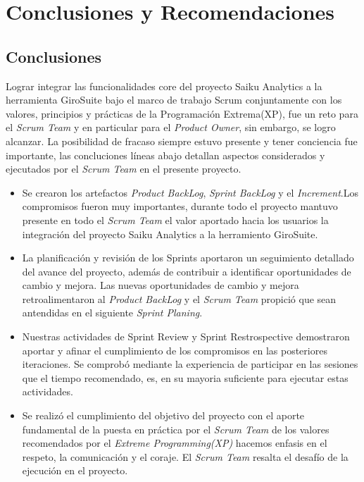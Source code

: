 \chapter{Conclusiones y Recomendaciones} \label{chapter:IV}
\begin{spacing}{1.5}
\section{Conclusiones}
Lograr integrar las funcionalidades core del proyecto Saiku Analytics a la herramienta GiroSuite bajo el marco de trabajo Scrum conjuntamente con los valores, principios y pr\'{a}cticas de la Programaci\'{o}n Extrema(XP), fue un reto para el \textit{Scrum Team} y en particular para el \textit{Product Owner}, sin embargo, se logro alcanzar. La posibilidad de fracaso siempre estuvo presente y tener conciencia fue importante, las concluciones l\'{i}neas abajo detallan aspectos considerados y ejecutados por el \textit{Scrum Team} en el presente proyecto.
\begin{itemize}
	
	\item Se crearon los artefactos \textit{Product BackLog}, \textit{Sprint BackLog} y el \textit{Increment}.Los compromisos fueron muy importantes, durante todo el proyecto mantuvo presente en todo el \textit{Scrum Team} el valor aportado hacia los usuarios la integraci\'{o}n del proyecto Saiku Analytics a la herramiento GiroSuite.
	
	\item La planificaci\'{o}n y revisi\'{o}n de los Sprints aportaron un seguimiento detallado del avance del proyecto, adem\'{a}s de contribuir a identificar oportunidades de cambio y mejora. Las nuevas oportunidades de cambio y mejora retroalimentaron al \textit{Product BackLog} y el \textit{Scrum Team} propici\'{o} que sean antendidas en el siguiente \textit{Sprint Planing}.
	
	\item Nuestras actividades de Sprint Review y Sprint Restrospective demostraron aportar y afinar el cumplimiento de los compromisos en las posteriores iteraciones. Se comprob\'{o} mediante la experiencia de participar en las sesiones que el tiempo recomendado, es, en su mayoria suficiente para ejecutar estas actividades.
	
	\item Se realiz\'{o} el cumplimiento del objetivo del proyecto con el aporte fundamental de la puesta en pr\'{a}ctica por el \textit{Scrum Team} de los valores recomendados por el \textit{Extreme Programming(XP)} hacemos enfasis en el respeto, la comunicaci\'{o}n y el coraje. El \textit{Scrum Team} resalta el desaf\'{i}o de la ejecuci\'{o}n en el proyecto.
	

\end{itemize}
\end{spacing}
